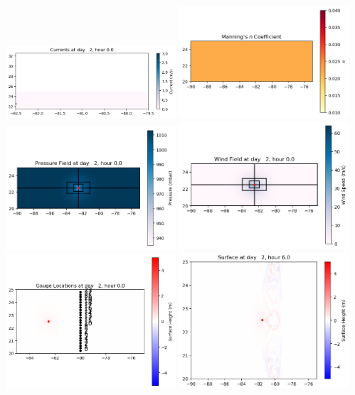 \documentclass[11pt]{article}
\begin{document}
\includegraphics[width=0.475\textwidth]{frame0008fig1004.png}
\vskip 10pt 
\includegraphics[width=0.475\textwidth]{frame0008fig1005.png}
\includegraphics[width=0.475\textwidth]{frame0008fig1006.png}
\vskip 10pt 
\includegraphics[width=0.475\textwidth]{frame0008fig1007.png}
\includegraphics[width=0.475\textwidth]{frame0008fig1008.png}
\vskip 10pt 
\includegraphics[width=0.475\textwidth]{frame0009fig1001.png}
\end{document}
